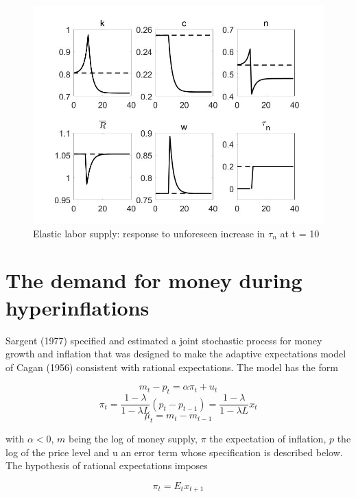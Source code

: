 \documentclass[a4paper,12pt]{scrartcl} %
\begin{document}
\begin{figure}[htbp!]
		\centering
			\includegraphics[width=0.8\linewidth]{fig20.jpg}
            \caption{Elastic labor supply: response to unforeseen increase in $\tau_n$ at t = 10}\label{20}
\end{figure}

\vspace{8cm}

\section{The demand for money during hyperinflations}

Sargent (1977) specified and estimated a joint stochastic process for money growth and inflation that was designed to make the adaptive expectations model of Cagan (1956) consistent with rational expectations. The model has the form

\begin{equation}\label{25}
    m_t-p_t=\alpha \pi_t+u_t
\end{equation}
\begin{equation}\label{26}
    \pi_t=\frac{1-\lambda}{1-\lambda L}(p_t-p_{t-1})=\frac{1-\lambda}{1-\lambda L}x_t
\end{equation}
\begin{equation}\label{27}
    \mu_t=m_t-m_{t-1}
\end{equation}

with $\alpha<0$, $m$ being the log of money supply, $\pi$ the expectation of inflation, $p$ the log of the price level and u an error term whose specification is described below. The hypothesis of rational expectations imposes

\begin{equation}\label{28}
    \pi_t=E_tx_{t+1}
\end{equation}
\end{document}
